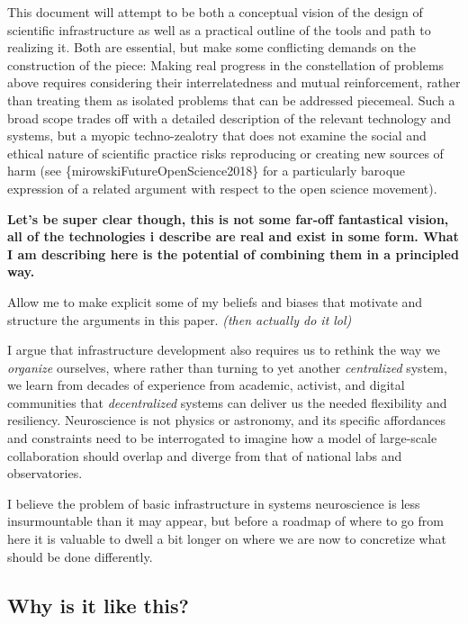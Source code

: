\documentclass{article}
\begin{document}
This document will attempt to be both a conceptual vision of the design
of scientific infrastructure as well as a practical outline of the tools
and path to realizing it. Both are essential, but make some conflicting
demands on the construction of the piece: Making real progress in the
constellation of problems above requires considering their
interrelatedness and mutual reinforcement, rather than treating them as
isolated problems that can be addressed piecemeal. Such a broad scope
trades off with a detailed description of the relevant technology and
systems, but a myopic techno-zealotry that does not examine the social
and ethical nature of scientific practice risks reproducing or creating
new sources of harm (see \{mirowskiFutureOpenScience2018\} for a
particularly baroque expression of a related argument with respect to
the open science movement).

\textbf{Let's be super clear though, this is not some far-off
fantastical vision, all of the technologies i describe are real and
exist in some form. What I am describing here is the potential of
combining them in a principled way.}

Allow me to make explicit some of my beliefs and biases that motivate
and structure the arguments in this paper. \emph{(then actually do it
lol)}

I argue that infrastructure development also requires us to rethink the
way we \emph{organize} ourselves, where rather than turning to yet
another \emph{centralized} system, we learn from decades of experience
from academic, activist, and digital communities that
\emph{decentralized} systems can deliver us the needed flexibility and
resiliency. Neuroscience is not physics or astronomy, and its specific
affordances and constraints need to be interrogated to imagine how a
model of large-scale collaboration should overlap and diverge from that
of national labs and observatories.

I believe the problem of basic infrastructure in systems neuroscience is
less insurmountable than it may appear, but before a roadmap of where to
go from here it is valuable to dwell a bit longer on where we are now to
concretize what should be done differently.

\hypertarget{why-is-it-like-this}{%
\subsection{Why is it like this?}\label{why-is-it-like-this}}
\end{document}

